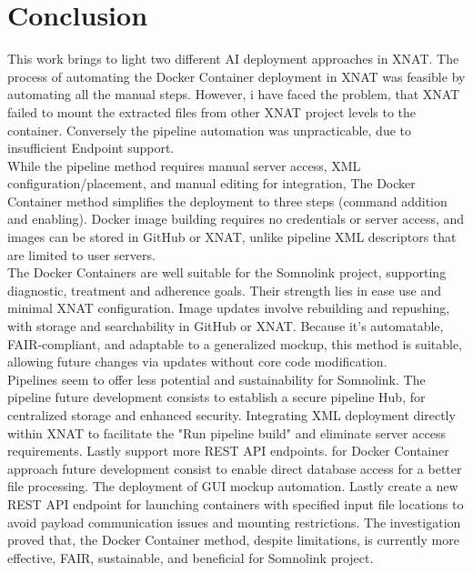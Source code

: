 \chapter{Conclusion}


This work brings to light two different AI deployment approaches in XNAT. 
The process of automating the Docker Container deployment in XNAT was feasible by automating all the manual steps. However, i have faced the problem, that XNAT failed to mount the extracted files from other XNAT project levels to the container. Conversely the pipeline automation was unpracticable, due to insufficient Endpoint support.   \\
While the pipeline method requires manual server access, XML configuration/placement, and manual editing for integration, The Docker Container method simplifies the deployment to three steps (command addition and enabling). Docker image building requires no credentials or server access, and images can be stored in GitHub or XNAT, unlike pipeline XML descriptors that are limited to user servers.\\
The Docker Containers are well suitable for the Somnolink project, supporting diagnostic, treatment and adherence goals. Their strength lies in ease use and minimal XNAT configuration. Image updates involve rebuilding and repushing, with storage and searchability in GitHub or XNAT. Because it's automatable, FAIR-compliant, and adaptable to a generalized mockup, this method is suitable, allowing future changes via updates without core code modification.\\
Pipelines seem to offer less potential and sustainability for Somnolink.
The pipeline future development consists to establish a secure pipeline Hub, for centralized storage and enhanced security. Integrating XML deployment directly within XNAT to facilitate the "Run pipeline build" and eliminate server access requirements. Lastly support more REST API endpoints.
for Docker Container approach future development consist to enable direct database access for a better file processing. The deployment of GUI mockup automation. Lastly create a new REST API endpoint for launching containers with specified input file locations to avoid payload communication issues and mounting restrictions.
The investigation proved that, the Docker Container method, despite limitations, is currently more effective, FAIR, sustainable, and beneficial for Somnolink project.



















